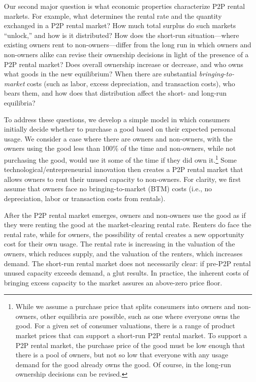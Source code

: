 \documentclass[12pt]{article}
\begin{document}
Our second major question is what economic properties characterize P2P rental markets. 
For example, what determines the rental rate and the quantity exchanged in a P2P rental market? 
How much total surplus do such markets ``unlock,'' and how is it distributed? 
How does the short-run situation---where existing owners rent to non-owners---differ from the long run in which owners and non-owners alike can revise their ownership decisions in light of the presence of a P2P rental market?
Does overall ownership increase or decrease, and who owns what goods in the new equilibrium?
When there are substantial \emph{bringing-to-market} costs (such as labor, excess depreciation, and transaction costs), who bears them, and how does that distribution affect the short- and long-run equilibria? 

To address these questions, we develop a simple model in which consumers initially decide whether to purchase a good based on their expected personal usage.
We consider a case where there are owners and non-owners, with the owners using the good less than 100\% of the time and non-owners, while not purchasing the good, would use it some of the time if they did own it.\footnote{
  While we assume a purchase price that splits consumers into owners and non-owners, other equilibria are possible, such as one where everyone owns the good.
  For a given set of consumer valuations, there is a range of product market prices that can support a short-run P2P rental market.
  To support a P2P rental market, the purchase price of the good must be low enough that there is a pool of owners, but not so low that everyone with any usage demand for the good already owns the good.
  Of course, in the long-run ownership decisions can be revised.
} 
Some technological/entrepreneurial innovation then creates a P2P rental market that allows owners to rent their unused capacity to non-owners.
For clarity, we first assume that owners face no bringing-to-market (BTM) costs (i.e., no depreciation, labor or transaction costs from rentals).

After the P2P rental market emerges, owners and non-owners use the good as if they were renting the good at the market-clearing rental rate. 
Renters do face the rental rate, while for owners, the possibility of rental creates a new opportunity cost for their own usage. 
The rental rate is increasing in the valuation of the owners, which reduces supply, and the valuation of the renters, which increases demand. 
The short-run rental market does not necessarily clear: if pre-P2P rental unused capacity exceeds demand, a glut results. 
In practice, the inherent costs of bringing excess capacity to the market assures an above-zero price floor.
\end{document}
